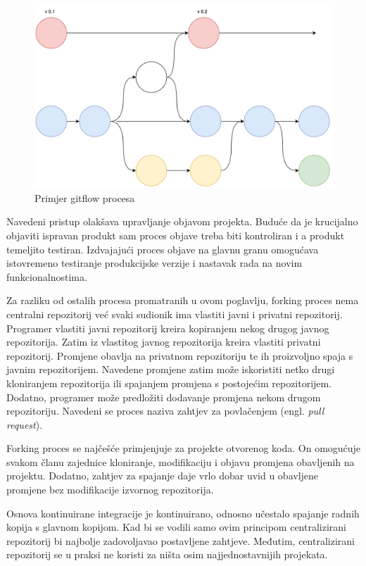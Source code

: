 \documentclass[times, utf8, diplomski, numeric]{fer}
\newcommand{\eng}[1]{(engl. \textit{#1})}
\begin{document}
\begin{figure}
\centering
\includegraphics[scale=0.5]{Gitflow}
\caption{Primjer gitflow procesa}
\label{fig:Gitflow}
\end{figure}

Navedeni pristup olakšava upravljanje objavom projekta. Buduće da je krucijalno objaviti ispravan produkt sam proces objave treba biti kontroliran i a produkt temeljito testiran. Izdvajajući proces objave na glavnu granu omogućava istovremeno testiranje produkcijske verzije i nastavak rada na novim funkcionalnostima.

Za razliku od ostalih procesa promatranih u ovom poglavlju, forking proces nema centralni repozitorij već svaki sudionik ima vlastiti javni i privatni repozitorij. Programer vlastiti javni repozitorij kreira kopiranjem nekog drugog javnog repozitorija. Zatim iz vlastitog javnog repozitorija kreira vlastiti privatni repozitorij. Promjene obavlja na privatnom repozitoriju te ih proizvoljno spaja s javnim repozitorijem. Navedene promjene zatim može iskoristiti netko drugi kloniranjem repozitorija ili spajanjem promjena s postojećim repozitorijem. Dodatno, programer može predložiti dodavanje promjena nekom drugom repozitoriju. Navedeni se proces naziva zahtjev za povlačenjem \eng{pull request}.

Forking proces se najčešće primjenjuje za projekte otvorenog koda. On omogućuje svakom članu zajednice kloniranje, modifikaciju i objavu promjena obavljenih na projektu. Dodatno, zahtjev za spajanje daje vrlo dobar uvid u obavljene promjene bez modifikacije izvornog repozitorija.

Osnova kontinuirane integracije je kontinuirano, odnosno učestalo spajanje radnih kopija s glavnom kopijom. Kad bi se vodili samo ovim principom centralizirani repozitorij bi najbolje zadovoljavao postavljene zahtjeve. Međutim, centralizirani repozitorij se u praksi ne koristi za ništa osim najjednostavnijih projekata.
\end{document}
